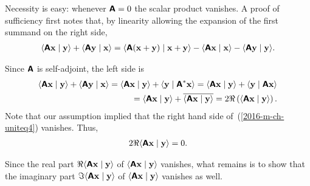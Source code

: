 {Necessity is easy: whenever $\textsf{\textbf{A}} = 0$ the scalar product vanishes.
A proof of sufficiency first notes that, by linearity allowing the expansion of the first summand on the right side,
\begin{equation}
\begin{split}
\langle \textsf{\textbf{A}} {\bf x} \mid {\bf y} \rangle
+
\langle \textsf{\textbf{A}} {\bf y} \mid {\bf x} \rangle
=
\langle \textsf{\textbf{A}} ( {\bf x} +{\bf y} ) \mid {\bf x} + {\bf y} \rangle
-
\langle \textsf{\textbf{A}} {\bf x} \mid {\bf x} \rangle
-
\langle \textsf{\textbf{A}} {\bf y} \mid {\bf y} \rangle
.
\end{split}
\label{2016-m-ch-uniteq4}
\end{equation}

Since $\textsf{\textbf{A}}$ is self-adjoint, the left side is
\begin{equation}
\begin{split}
\langle \textsf{\textbf{A}} {\bf x} \mid {\bf y} \rangle
+
\langle \textsf{\textbf{A}} {\bf y} \mid {\bf x} \rangle
=
\langle \textsf{\textbf{A}} {\bf x} \mid {\bf y} \rangle
+
\langle {\bf y} \mid  \textsf{\textbf{A}}^\ast {\bf x} \rangle
=
\langle \textsf{\textbf{A}} {\bf x} \mid {\bf y} \rangle
+
\langle {\bf y} \mid  \textsf{\textbf{A}} {\bf x} \rangle  \\
=
\langle \textsf{\textbf{A}} {\bf x} \mid {\bf y} \rangle
+
\overline{ \langle \textsf{\textbf{A}} {\bf x} \mid  {\bf y} \rangle }
= 2 \Re \left( \langle \textsf{\textbf{A}} {\bf x} \mid {\bf y} \rangle      \right)
.
\end{split}
\label{2016-m-ch-uniteq5}
\end{equation}
Note that our assumption implied that the right hand side of~(\ref{2016-m-ch-uniteq4}) vanishes.
Thus, 
\begin{equation}
\begin{split}
2 \Re  \langle \textsf{\textbf{A}} {\bf x} \mid {\bf y} \rangle
=
0
.
\end{split}
\label{2016-m-ch-uniteq6}
\end{equation}

Since the real part
$\Re  \langle \textsf{\textbf{A}} {\bf x} \mid {\bf y} \rangle$
of $ \langle \textsf{\textbf{A}} {\bf x} \mid {\bf y} \rangle$ vanishes,
what remains is to show that the imaginary part
$\Im  \langle \textsf{\textbf{A}} {\bf x} \mid {\bf y} \rangle$
of  $\langle \textsf{\textbf{A}} {\bf x} \mid {\bf y} \rangle$
vanishes as well.

}
